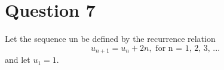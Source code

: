 


\section*{Question 7}
Let the sequence un be defined by the recurrence relation
\[u_{n+1} = u_n + 2n, \mbox{ for n = 1, 2, 3, ...}\]
and let $u_1 = 1$.\\

